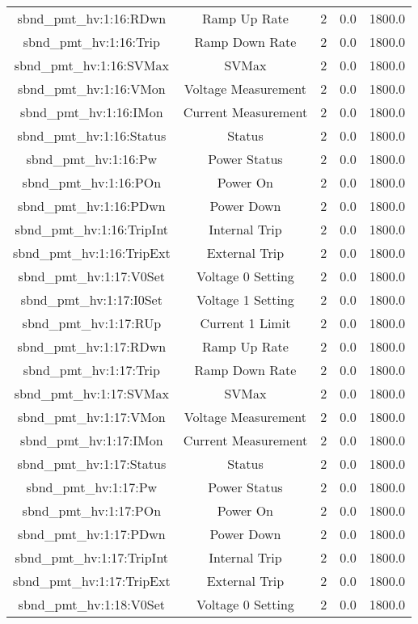 \begin{table}[ptb]
\begin{tabular}{c | c c c c}
sbnd_pmt_hv:1:16:RDwn & Ramp Up Rate & 2 & 0.0 & 1800.0\\ 
sbnd_pmt_hv:1:16:Trip & Ramp Down Rate & 2 & 0.0 & 1800.0\\ 
sbnd_pmt_hv:1:16:SVMax & SVMax & 2 & 0.0 & 1800.0\\ 
sbnd_pmt_hv:1:16:VMon & Voltage Measurement & 2 & 0.0 & 1800.0\\ 
sbnd_pmt_hv:1:16:IMon & Current Measurement & 2 & 0.0 & 1800.0\\ 
sbnd_pmt_hv:1:16:Status & Status & 2 & 0.0 & 1800.0\\ 
sbnd_pmt_hv:1:16:Pw & Power Status & 2 & 0.0 & 1800.0\\ 
sbnd_pmt_hv:1:16:POn & Power On & 2 & 0.0 & 1800.0\\ 
sbnd_pmt_hv:1:16:PDwn & Power Down & 2 & 0.0 & 1800.0\\ 
sbnd_pmt_hv:1:16:TripInt & Internal Trip & 2 & 0.0 & 1800.0\\ 
sbnd_pmt_hv:1:16:TripExt & External Trip & 2 & 0.0 & 1800.0\\ 
sbnd_pmt_hv:1:17:V0Set & Voltage 0 Setting & 2 & 0.0 & 1800.0\\ 
sbnd_pmt_hv:1:17:I0Set & Voltage 1 Setting & 2 & 0.0 & 1800.0\\ 
sbnd_pmt_hv:1:17:RUp & Current 1 Limit & 2 & 0.0 & 1800.0\\ 
sbnd_pmt_hv:1:17:RDwn & Ramp Up Rate & 2 & 0.0 & 1800.0\\ 
sbnd_pmt_hv:1:17:Trip & Ramp Down Rate & 2 & 0.0 & 1800.0\\ 
sbnd_pmt_hv:1:17:SVMax & SVMax & 2 & 0.0 & 1800.0\\ 
sbnd_pmt_hv:1:17:VMon & Voltage Measurement & 2 & 0.0 & 1800.0\\ 
sbnd_pmt_hv:1:17:IMon & Current Measurement & 2 & 0.0 & 1800.0\\ 
sbnd_pmt_hv:1:17:Status & Status & 2 & 0.0 & 1800.0\\ 
sbnd_pmt_hv:1:17:Pw & Power Status & 2 & 0.0 & 1800.0\\ 
sbnd_pmt_hv:1:17:POn & Power On & 2 & 0.0 & 1800.0\\ 
sbnd_pmt_hv:1:17:PDwn & Power Down & 2 & 0.0 & 1800.0\\ 
sbnd_pmt_hv:1:17:TripInt & Internal Trip & 2 & 0.0 & 1800.0\\ 
sbnd_pmt_hv:1:17:TripExt & External Trip & 2 & 0.0 & 1800.0\\ 
sbnd_pmt_hv:1:18:V0Set & Voltage 0 Setting & 2 & 0.0 & 1800.0\\ 

\end{tabular}
\end{table}

